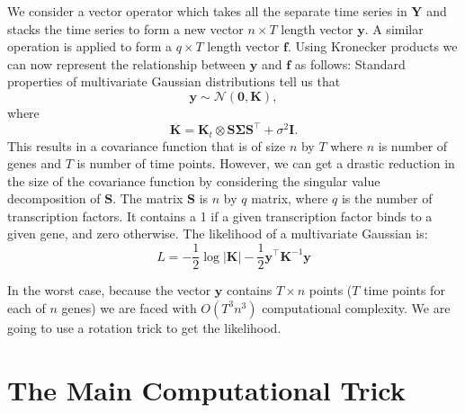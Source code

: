 We consider a vector operator which takes all the separate time series in $\mathbf{Y}$ and stacks the time series 
to form a new vector $n\times T$ length vector $\mathbf{y}$. A similar operation is applied to form a $q \times T$ 
length vector $\mathbf{f}$. Using Kronecker products we can now represent the relationship between $\mathbf{y}$ and 
$\mathbf{f}$ as follows:  
Standard properties of multivariate Gaussian distributions tell us that
\begin{equation} \label{eq:mGPd}
\mathbf{y} \sim \mathcal{N}(\mathbf{0}, \mathbf{K}),
\end{equation}
where
\begin{equation} \label{eq:K}
\mathbf{K} = \mathbf{K}_t \otimes \mathbf{S} \boldsymbol{\Sigma} \mathbf{S}^\top + \sigma^2 \mathbf{I}.
\end{equation}
This results in a covariance function that is of size $n$ by $T$ where $n$ is number of genes and $T$ is number of 
time points. However, we can get a drastic reduction in the size of the covariance function by considering 
the singular value decomposition of $\mathbf{S}$. 
The matrix $\mathbf{S}$ is $n$ by $q$ matrix, where $q$ is the number of transcription factors. It contains a 1 
if a given transcription factor binds to a given gene, and zero otherwise. 
The likelihood of a multivariate Gaussian is:
\begin{equation} \label{eq:Likelihood}
L = -\frac{1}{2} \log |\mathbf{K}| - \frac{1}{2} \mathbf{y}^\top \mathbf{K}^{-1} \mathbf{y}
\end{equation}

In the worst case, because the vector $\mathbf{y}$ contains $T\times n$ points ($T$ time points for 
each of $n$ genes) we are faced with $O(T^3n^3)$ computational complexity. We are going to use a rotation trick to 
get the likelihood. 

\section{The Main Computational Trick}

